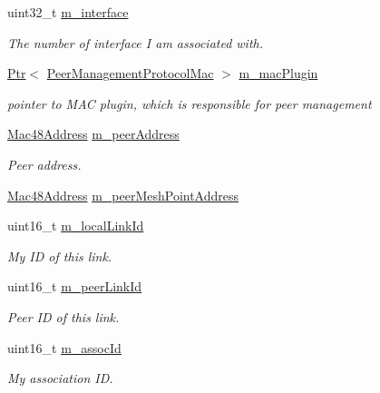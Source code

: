 \begin{DoxyCompactItemize}
\item 
uint32\+\_\+t \hyperlink{classns3_1_1dot11s_1_1PeerLink_a6b0fe858e47643e69278c01da8350f6f}{m\+\_\+interface}
\begin{DoxyCompactList}\small\item\em The number of interface I am associated with. \end{DoxyCompactList}\item 
\hyperlink{classns3_1_1Ptr}{Ptr}$<$ \hyperlink{classns3_1_1dot11s_1_1PeerManagementProtocolMac}{Peer\+Management\+Protocol\+Mac} $>$ \hyperlink{classns3_1_1dot11s_1_1PeerLink_a07c267b43c6df4fe43f25caf07d7fd56}{m\+\_\+mac\+Plugin}
\begin{DoxyCompactList}\small\item\em pointer to M\+AC plugin, which is responsible for peer management \end{DoxyCompactList}\item 
\hyperlink{classns3_1_1Mac48Address}{Mac48\+Address} \hyperlink{classns3_1_1dot11s_1_1PeerLink_ab442de76f74778662919cc3d3d51cdd8}{m\+\_\+peer\+Address}
\begin{DoxyCompactList}\small\item\em Peer address. \end{DoxyCompactList}\item 
\hyperlink{classns3_1_1Mac48Address}{Mac48\+Address} \hyperlink{classns3_1_1dot11s_1_1PeerLink_a610c8fd3d7f1c337f912c4a95d7c3dbc}{m\+\_\+peer\+Mesh\+Point\+Address}
\item 
uint16\+\_\+t \hyperlink{classns3_1_1dot11s_1_1PeerLink_ae0647b7f17be8e5f3f721cf4c714ab81}{m\+\_\+local\+Link\+Id}
\begin{DoxyCompactList}\small\item\em My ID of this link. \end{DoxyCompactList}\item 
uint16\+\_\+t \hyperlink{classns3_1_1dot11s_1_1PeerLink_af620e2d2607904bc9b5d107aa1524038}{m\+\_\+peer\+Link\+Id}
\begin{DoxyCompactList}\small\item\em Peer ID of this link. \end{DoxyCompactList}\item 
uint16\+\_\+t \hyperlink{classns3_1_1dot11s_1_1PeerLink_af3a64d46026ef508ab62111008ce4084}{m\+\_\+assoc\+Id}
\begin{DoxyCompactList}\small\item\em My association ID. \end{DoxyCompactList}\item 

\end{DoxyCompactItemize}
